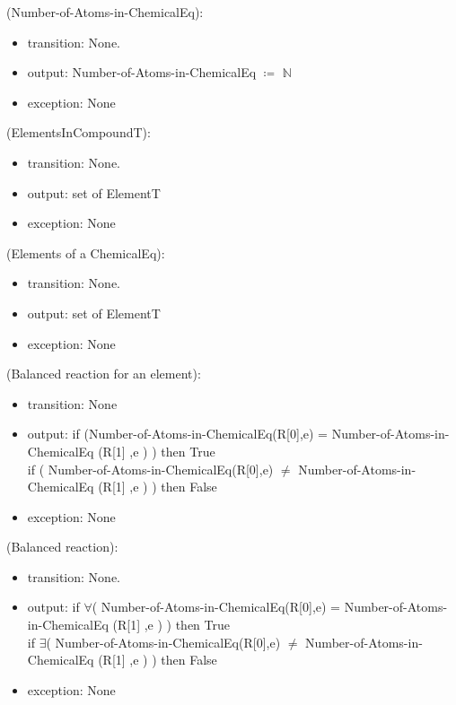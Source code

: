 \documentclass[12pt, titlepage]{article}
\begin{document}
\noindent (Number-of-Atoms-in-ChemicalEq):
\begin{itemize}
\item transition: None.
\item output: Number-of-Atoms-in-ChemicalEq $\coloneqq$  $\mathbb{N}$
\item exception:  None
\end{itemize}

\noindent (ElementsInCompoundT):
\begin{itemize}
\item transition: None.
\item output: set of ElementT 
\item exception:  None
\end{itemize}

\noindent (Elements of a ChemicalEq):
\begin{itemize}
\item transition: None.
\item output: set of ElementT
\item exception:  None
\end{itemize}

\noindent (Balanced reaction for an element):
\begin{itemize}
\item transition: None 
\item output: if (Number-of-Atoms-in-ChemicalEq(R[0],e) = Number-of-Atoms-in-ChemicalEq (R[1] ,e ) )
then True\\
if ( Number-of-Atoms-in-ChemicalEq(R[0],e) $\neq$ Number-of-Atoms-in-ChemicalEq (R[1] ,e ) ) then False
\item exception:  None
\end{itemize}

\noindent (Balanced reaction):
\begin{itemize}
\item transition: None.
\item output: if $\forall$( Number-of-Atoms-in-ChemicalEq(R[0],e) = Number-of-Atoms-in-ChemicalEq (R[1] ,e ) )
then True\\
if $\exists$( Number-of-Atoms-in-ChemicalEq(R[0],e) $\neq$ Number-of-Atoms-in-ChemicalEq (R[1] ,e ) )
then False
\item exception:  None
\end{itemize}
\end{document}
